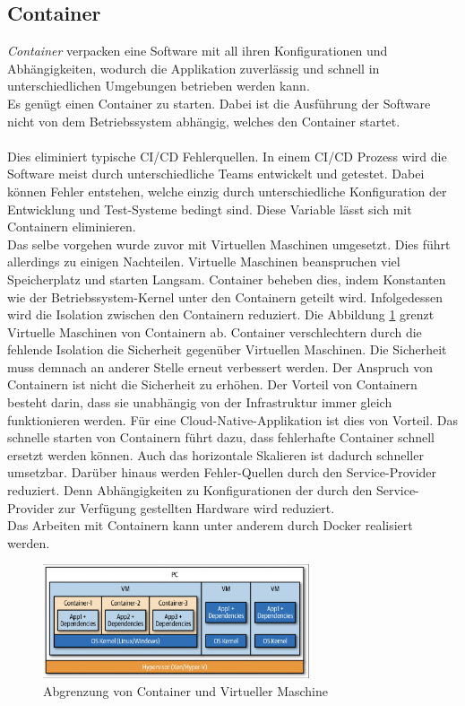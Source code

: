\subsection{Container}
\textit{Container} verpacken eine Software mit all ihren Konfigurationen und Abhängigkeiten, wodurch die Applikation zuverlässig und schnell in unterschiedlichen Umgebungen betrieben werden kann.\\
Es genügt einen Container zu starten. Dabei ist die Ausführung der Software nicht von dem Betriebssystem abhängig, welches den Container startet. \cite{docker_what_nodate}\\\\
Dies eliminiert typische CI/CD Fehlerquellen. In einem CI/CD Prozess wird die Software meist durch unterschiedliche Teams entwickelt und getestet. Dabei können Fehler entstehen, welche einzig durch unterschiedliche Konfiguration der Entwicklung und Test-Systeme bedingt sind. Diese Variable lässt sich mit Containern eliminieren. \cite{scholl_cloud_2019}\\
Das selbe vorgehen wurde zuvor mit Virtuellen Maschinen umgesetzt. Dies führt allerdings zu einigen Nachteilen. Virtuelle Maschinen beanspruchen viel Speicherplatz und starten Langsam. Container beheben dies, indem Konstanten wie der Betriebssystem-Kernel unter den Containern geteilt wird. Infolgedessen wird die Isolation zwischen den Containern reduziert. Die Abbildung \ref{fig:vm-vs-container} grenzt Virtuelle Maschinen von Containern ab. Container verschlechtern durch die fehlende Isolation die Sicherheit gegenüber Virtuellen Maschinen. Die Sicherheit muss demnach an anderer Stelle erneut verbessert werden. Der Anspruch von Containern ist nicht die Sicherheit zu erhöhen. Der Vorteil von Containern besteht darin, dass sie unabhängig von der Infrastruktur immer gleich funktionieren werden. Für eine Cloud-Native-Applikation ist dies von Vorteil. Das schnelle starten von Containern führt dazu, dass fehlerhafte Container schnell ersetzt werden können. Auch das horizontale Skalieren ist dadurch schneller umsetzbar. Darüber hinaus werden Fehler-Quellen durch den Service-Provider reduziert. Denn Abhängigkeiten zu Konfigurationen der durch den Service-Provider zur Verfügung gestellten Hardware wird reduziert.\\
Das Arbeiten mit Containern kann unter anderem durch Docker \cite{docker_what_nodate} realisiert werden. 

\begin{figure}[bth] 
  \centering
  \includegraphics[width=0.7\textwidth]{Chapters/2-Grundlagen/Graphics/container-vs-vm.png}
  \caption{Abgrenzung von Container und Virtueller Maschine \cite{scholl_cloud_2019}}
  \label{fig:vm-vs-container}
\end{figure}

